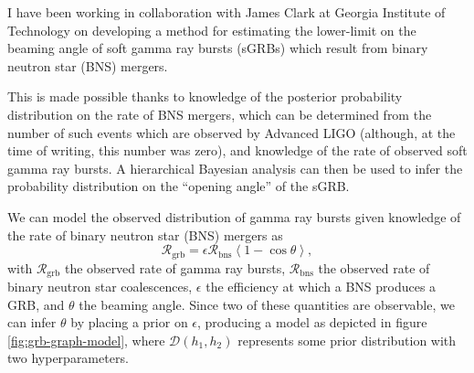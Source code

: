 \documentclass[openleft]{kentigern}
\theoremstyle{definition}
\begin{document}
I have been working in collaboration with James Clark at Georgia
Institute of Technology on developing a method for estimating the
lower-limit on the beaming angle of soft gamma ray bursts (sGRBs)
which result from binary neutron star (BNS) mergers.

This is made possible thanks to knowledge of the posterior probability
distribution on the rate of BNS mergers, which can be determined from
the number of such events which are observed by Advanced LIGO
(although, at the time of writing, this number was zero), and
knowledge of the rate of observed soft gamma ray bursts. A
hierarchical Bayesian analysis can then be used to infer the
probability distribution on the ``opening angle'' of the sGRB.

We can model the observed distribution of gamma ray bursts given
knowledge of the rate of binary neutron star (BNS) mergers as
\begin{equation}
  \label{eq:grb-rate}
  \mathcal{R}_{\mathrm{grb}} = \epsilon \mathcal{R}_{\mathrm{bns}} \left\langle 1 - \cos\theta \right\rangle,
\end{equation}
with $\mathcal{R}_{\mathrm{grb}}$ the observed rate of gamma ray
bursts, $\mathcal{R}_{\mathrm{bns}}$ the observed rate of binary
neutron star coalescences, $\epsilon$ the efficiency at which a BNS
produces a GRB, and $\theta$ the beaming angle. Since two of these
quantities are observable, we can infer $\theta$ by placing a prior on
$\epsilon$, producing a model as depicted in figure
\ref{fig:grb-graph-model}, where $\mathcal{D}(h_1, h_2)$ represents
some prior distribution with two hyperparameters.
\end{document}
